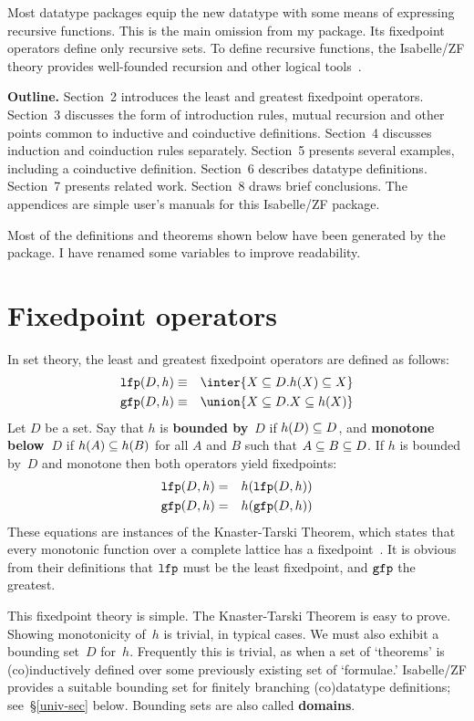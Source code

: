 Most datatype packages equip the new datatype with some means of expressing
recursive functions.  This is the main omission from my package.  Its
fixedpoint operators define only recursive sets.  To define recursive
functions, the Isabelle/ZF theory provides well-founded recursion and other
logical tools~\cite{paulson-set-II}.

{\bf Outline.} Section~2 introduces the least and greatest fixedpoint
operators.  Section~3 discusses the form of introduction rules, mutual
recursion and other points common to inductive and coinductive definitions.
Section~4 discusses induction and coinduction rules separately.  Section~5
presents several examples, including a coinductive definition.  Section~6
describes datatype definitions.  Section~7 presents related work.
Section~8 draws brief conclusions.  \ifCADE\else The appendices are simple
user's manuals for this Isabelle/ZF package.\fi

Most of the definitions and theorems shown below have been generated by the
package.  I have renamed some variables to improve readability.
 
\section{Fixedpoint operators}
In set theory, the least and greatest fixedpoint operators are defined as
follows:
\begin{eqnarray*}
   \lfp(D,h)  & \equiv & \inter\{X\sbs D. h(X)\sbs X\} \\
   \gfp(D,h)  & \equiv & \union\{X\sbs D. X\sbs h(X)\}
\end{eqnarray*}   
Let $D$ be a set.  Say that $h$ is {\bf bounded by}~$D$ if $h(D)\subseteq D$, and
{\bf monotone below~$D$} if
$h(A)\subseteq h(B)$ for all $A$ and $B$ such that $A\subseteq B\subseteq D$.  If $h$ is
bounded by~$D$ and monotone then both operators yield fixedpoints:
\begin{eqnarray*}
   \hbox{\tt lfp}(D,h)  & = & h(\hbox{\tt lfp}(D,h)) \\
   \hbox{\tt gfp}(D,h)  & = & h(\hbox{\tt gfp}(D,h)) 
\end{eqnarray*}   
These equations are instances of the Knaster-Tarski Theorem, which states
that every monotonic function over a complete lattice has a
fixedpoint~\cite{davey&priestley}.  It is obvious from their definitions
that  $\hbox{\tt lfp}$ must be the least fixedpoint, and $\hbox{\tt gfp}$ the greatest.

This fixedpoint theory is simple.  The Knaster-Tarski Theorem is easy to
prove.  Showing monotonicity of~$h$ is trivial, in typical cases.  We must
also exhibit a bounding set~$D$ for~$h$.  Frequently this is trivial, as
when a set of `theorems' is (co)inductively defined over some previously
existing set of `formulae.'  Isabelle/ZF provides a suitable bounding set
for finitely branching (co)datatype definitions; see~\S\ref{univ-sec}
below.  Bounding sets are also called {\bf domains}.

